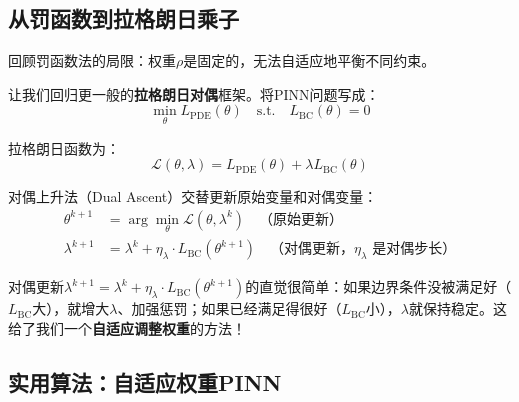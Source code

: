\subsection{从罚函数到拉格朗日乘子}

回顾罚函数法的局限：权重$\rho$是固定的，无法自适应地平衡不同约束。

让我们回归更一般的\textbf{拉格朗日对偶}框架。将PINN问题写成：
\begin{equation}
    \min_\theta L_{\text{PDE}}(\theta) \quad \text{s.t.} \quad L_{\text{BC}}(\theta) = 0
\end{equation}

拉格朗日函数为：
\begin{equation}
    \mathcal{L}(\theta, \lambda) = L_{\text{PDE}}(\theta) + \lambda L_{\text{BC}}(\theta)
\end{equation}

\begin{definition}[对偶上升法]
对偶上升法（Dual Ascent）交替更新原始变量和对偶变量：
\begin{align}
    \theta^{k+1} &= \arg\min_\theta \mathcal{L}(\theta, \lambda^k) \quad \text{（原始更新）} \\
    \lambda^{k+1} &= \lambda^k + \eta_\lambda \cdot L_{\text{BC}}(\theta^{k+1}) \quad \text{（对偶更新，$\eta_\lambda$ 是对偶步长）}
\end{align}
\end{definition}

\begin{tcolorbox}[colback=green!5, colframe=green!50, title=关键洞察]
对偶更新$\lambda^{k+1} = \lambda^k + \eta_\lambda \cdot L_{\text{BC}}(\theta^{k+1})$的直觉很简单：如果边界条件没被满足好（$L_{\text{BC}}$大），就增大$\lambda$、加强惩罚；如果已经满足得很好（$L_{\text{BC}}$小），$\lambda$就保持稳定。这给了我们一个\textbf{自适应调整权重}的方法！
\end{tcolorbox}

\subsection{实用算法：自适应权重PINN}

